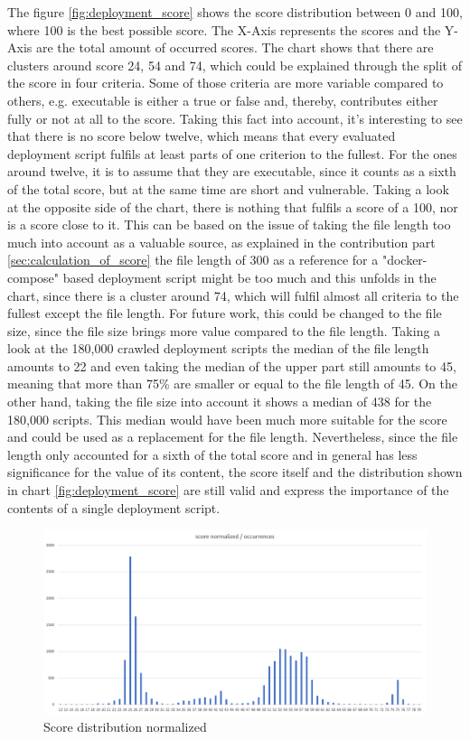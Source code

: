 The figure \ref{fig:deployment_score} shows the score distribution between 0 and 100, where 100 is the best possible score. The X-Axis represents the scores and the Y-Axis are the total amount of occurred scores. The chart shows that there are clusters around score 24, 54 and 74, which could be explained through the split of the score in four criteria. Some of those criteria are more variable compared to others, e.g. executable is either a true or false and, thereby, contributes either fully or not at all to the score. Taking this fact into account, it's interesting to see that there is no score below twelve, which means that every evaluated deployment script fulfils at least parts of one criterion to the fullest. For the ones around twelve, it is to assume that they are executable, since it counts as a sixth of the total score, but at the same time are short and vulnerable. Taking a look at the opposite side of the chart, there is nothing that fulfils a score of a 100, nor is a score close to it. This can be based on the issue of taking the file length too much into account as a valuable source, as explained in the contribution part \ref{sec:calculation_of_score} the file length of 300 as a reference for a "docker-compose" based deployment script might be too much and this unfolds in the chart, since there is a cluster around 74, which will fulfil almost all criteria to the fullest except the file length. For future work, this could be changed to the file size, since the file size brings more value compared to the file length. Taking a look at the 180,000 crawled deployment scripts the median of the file length amounts to 22 and even taking the median of the upper part still amounts to 45, meaning that more than 75\% are smaller or equal to the file length of 45. On the other hand, taking the file size into account it shows a median of 438 for the 180,000 scripts. This median would have been much more suitable for the score and could be used as a replacement for the file length. Nevertheless, since the file length only accounted for a sixth of the total score and in general has less significance for the value of its content, the score itself and the distribution shown in chart \ref{fig:deployment_score} are still valid and express the importance of the contents of a single deployment script.

\begin{figure}[H]
    \centering
    \includegraphics[scale=0.5]{graphics/deployment_score_normalized.png}
    \caption{Score distribution normalized}
    \label{fig:deployment_score_normalized}
\end{figure}

